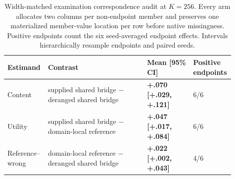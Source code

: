 \begin{table}[H]
\caption{Width-matched examination correspondence audit at $K=256$. Every arm allocates two columns per non-endpoint member and preserves one materialized member-value location per row before native missingness. Positive endpoints count the six seed-averaged endpoint effects. Intervals hierarchically resample endpoints and paired seeds.}
\label{tab:app-exam-no-bridge}
\centering\scriptsize
\setlength{\tabcolsep}{2pt}
\begin{tabular}{P{0.15\linewidth}P{0.43\linewidth}P{0.20\linewidth}P{0.13\linewidth}}
\toprule Estimand & Contrast & Mean [95\% CI] & Positive endpoints \\
\midrule
Content & supplied shared bridge $-$ deranged shared bridge & \textbf{+.070 [+.029, +.121]} & 6/6 \\
Utility & supplied shared bridge $-$ domain-local reference & \textbf{+.047 [+.017, +.084]} & 6/6 \\
Reference--wrong & domain-local reference $-$ deranged shared bridge & \textbf{+.022 [+.002, +.043]} & 4/6 \\
\bottomrule\end{tabular}
\end{table}
